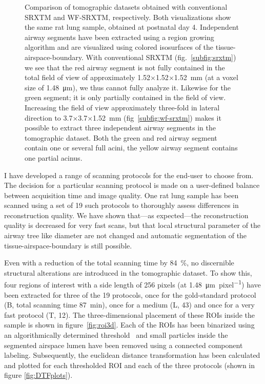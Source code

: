 \documentclass[a4paper,twoside,DIV=calc]{scrartcl}
\newlength\imagescale
\begin{document}
\begin{figure}[ht]
{%
		\fi
		\label{subfig:wf-srxtm}%
		}%
	\caption{Comparison of tomographic datasets obtained with conventional SRXTM and WF-SRXTM, respectively. Both visualizations show the same rat lung sample, obtained at postnatal day 4. Independent airway segments have been extracted using a region growing algorithm and are visualized using colored isosurfaces of the tissue-airspace-boundary. With conventional SRXTM (fig.~\ref{subfig:srxtm}) we see that the red airway segment is not fully contained in the total field of view of approximately 1.52$\times$1.52$\times$\SI{1.52}{\milli\meter} (at a voxel size of \SI{1.48}{\micro\meter}), we thus cannot fully analyze it. Likewise for the green segment; it is only partially contained in the field of view. Increasing the field of view approximately three-fold in lateral direction to 3.7$\times$3.7$\times$\SI{1.52}{\milli\meter} %
(fig~\ref{subfig:wf-srxtm}) makes it possible to extract three independent airway segments in the tomographic dataset. Both the green and red airway segment contain one or several full acini, the yellow airway segment contains one partial acinus.%
}%
\label{fig:wfs-overview}%
\end{figure}

I have developed a range of scanning protocols for the end-user to choose from. The decision for a particular scanning protocol is made on a user-defined balance between acquisition time and image quality. One rat lung sample has been scanned using a set of 19 such protocols to thoroughly assess differences in reconstruction quality. We have shown that---as expected---the reconstruction quality is decreased for very fast scans, but that local structural parameter of the airway tree like diameter are not changed and automatic segmentation of the tissue-airspace-boundary is still possible.

Even with a reduction of the total scanning time by \SI{84}{\percent}, no discernible structural alterations are introduced in the tomographic dataset. To show this, four regions of interest with a side length of 256 pixels (at \SI{1.48}{\micro\meter\per pixel}) have been extracted for three of the 19 protocols, once for the gold-standard protocol (B, total scanning time \SI{87}{\minute}), once for a medium (L, \SI{43}{\min}) and once for a very fast protocol (T, \SI{12}{\min}). The three-dimensional placement of these ROIs inside the sample is shown in figure~\ref{fig:roi3d}. Each of the ROIs has been binarized using an algorithmically determined threshold~\cite{Otsu1979} and small particles inside the segmented airspace lumen have been removed using a connected component labeling. Subsequently, the euclidean distance transformation has been calculated and plotted for each thresholded ROI and each of the three protocols (shown in figure	\ref{fig:DTFplots}).
\end{document}
